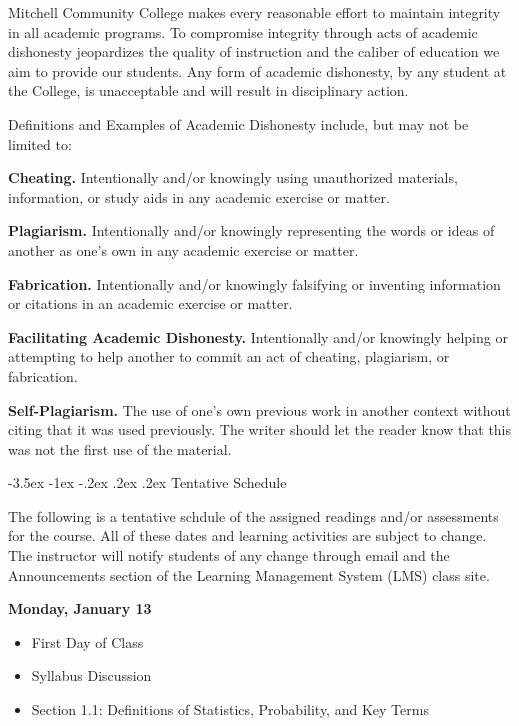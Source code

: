 \documentclass[11pt]{article}
\makeatletter
\renewcommand\section{\@startsection{section}{1}{0pt}%
  {-3.5ex \@plus -1ex \@minus -.2ex}%
  {.2ex \@plus.2ex}%
  {\normalfont\Large\bfseries}} %
\makeatother
\begin{document}
Mitchell Community College makes every reasonable effort to maintain integrity in all academic programs. To compromise integrity through acts of academic dishonesty jeopardizes the quality of instruction and the caliber of education we aim to provide our students.  Any form of academic dishonesty, by any student at the College, is unacceptable and will result in disciplinary action.

Definitions and Examples of Academic Dishonesty include, but may not be limited to:

\textbf{Cheating.} Intentionally and/or knowingly using unauthorized materials, information, or study aids in any academic exercise or matter.

\textbf{Plagiarism.} Intentionally and/or knowingly representing the words or ideas of another as one's own in any academic exercise or matter.

\textbf{Fabrication.} Intentionally and/or knowingly falsifying or inventing information or citations in an academic exercise or matter.

\textbf{Facilitating Academic Dishonesty.} Intentionally and/or knowingly helping or attempting to help another to commit an act of cheating, plagiarism, or fabrication.

\textbf{Self-Plagiarism.} The use of one's own previous work in another context without citing that it was used previously. The writer should let the reader know that this was not the first use of the material.

\pagebreak
\section{Tentative Schedule}

The following is a tentative schdule of the assigned readings and/or assessments for the course. All of these dates and learning activities are subject to change. The instructor will notify students of any change through email and the Announcements section of the Learning Management System (LMS) class site.

\textbf{Monday, January 13}

\begin{itemize}
\item First Day of Class
\item Syllabus Discussion
\item Section 1.1: Definitions of Statistics, Probability, and Key Terms
\end{itemize}
\end{document}
